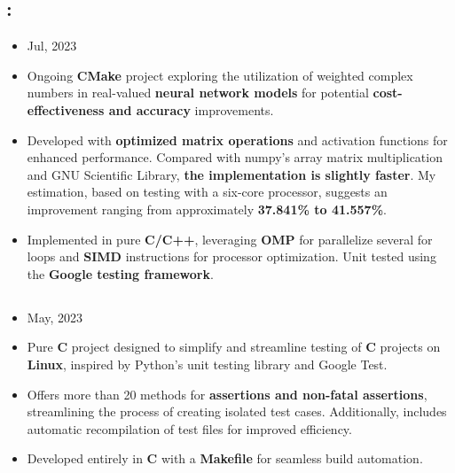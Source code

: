\documentclass[11pt]{article}
\begin{document}
\subsection*{\href{https://github.com/alecksandr26/cnet}{\color{blue}{Complex Neural Networks Framework From Scratch}}:}
\vspace{-0.3cm}
\begin{itemize}[noitemsep, nolistsep]
\item Jul, 2023
\item Ongoing \textbf{CMake} project exploring the utilization of weighted complex numbers in real-valued
  \textbf{neural network models} for potential \textbf{cost-effectiveness and accuracy} improvements.
\item Developed with \textbf{optimized matrix operations} and activation functions for enhanced performance.
  Compared with numpy's array matrix multiplication and GNU Scientific Library,
  \textbf{the implementation is slightly faster}.
  My estimation, based on testing with a six-core processor, suggests an improvement ranging from
  approximately \textbf{37.841\% to 41.557\%}.
\item Implemented in pure \textbf{C/C++}, leveraging \textbf{OMP} for parallelize several for loops
  and \textbf{SIMD} instructions for processor optimization. Unit tested using the
  \textbf{Google testing framework}.
\end{itemize}
\vspace{-0.3cm}
\subsection*{\href{https://github.com/alecksandr26/unittest-c}{\color{blue}{Unit Testing Framework for C in Linux:}}}
\vspace{-0.3cm}
\begin{itemize}[noitemsep, nolistsep]
\item May, 2023
\item Pure \textbf{C} project designed to simplify and streamline testing of \textbf{C} projects on
  \textbf{Linux}, inspired by Python's unit testing library and Google Test.
\item Offers more than 20 methods for \textbf{assertions and non-fatal assertions}, streamlining the
  process of creating isolated test cases. Additionally, includes automatic recompilation of test files
  for improved efficiency.
\item Developed entirely in \textbf{C} with a \textbf{Makefile} for seamless build automation.
\end{itemize}
\vspace{-0.3cm}
\end{document}
